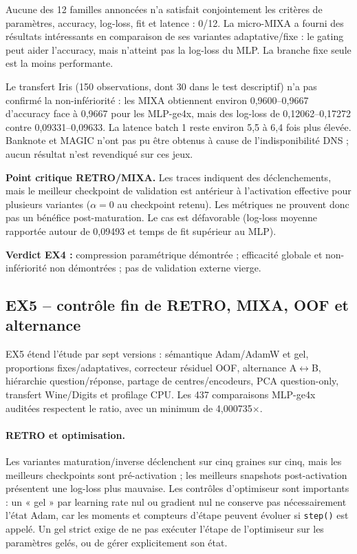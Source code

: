 \documentclass[11pt,a4paper]{article}
\newcommand{\code}[1]{\texttt{\detokenize{#1}}}
\begin{document}
Aucune des 12 familles annoncées n'a satisfait conjointement les critères de paramètres, accuracy, log-loss, fit et latence : 0/12. La micro-MIXA a fourni des résultats intéressants en comparaison de ses variantes adaptative/fixe : le gating peut aider l'accuracy, mais n'atteint pas la log-loss du MLP. La branche fixe seule est la moins performante.

Le transfert Iris (150 observations, dont 30 dans le test descriptif) n'a pas confirmé la non-infériorité : les MIXA obtiennent environ 0,9600--0,9667 d'accuracy face à 0,9667 pour les MLP-ge4x, mais des log-loss de 0,12062--0,17272 contre 0,09331--0,09633. La latence batch 1 reste environ 5,5 à 6,4 fois plus élevée. Banknote et MAGIC n'ont pas pu être obtenus à cause de l'indisponibilité DNS ; aucun résultat n'est revendiqué sur ces jeux.

\textbf{Point critique RETRO/MIXA.} Les traces indiquent des déclenchements, mais le meilleur checkpoint de validation est antérieur à l'activation effective pour plusieurs variantes (\(\alpha=0\) au checkpoint retenu). Les métriques ne prouvent donc pas un bénéfice post-maturation. Le cas \code{retro_linear} est défavorable (log-loss moyenne rapportée autour de 0,09493 et temps de fit supérieur au MLP).

\textbf{Verdict EX4 :} compression paramétrique démontrée ; efficacité globale et non-infériorité non démontrées ; pas de validation externe vierge.

\subsection{EX5 -- contrôle fin de RETRO, MIXA, OOF et alternance}

EX5 étend l'étude par sept versions : sémantique Adam/AdamW et gel, proportions fixes/adaptatives, correcteur résiduel OOF, alternance A\(\leftrightarrow\)B, hiérarchie question/réponse, partage de centres/encodeurs, PCA question-only, transfert Wine/Digits et profilage CPU. Les 437 comparaisons MLP-ge4x auditées respectent le ratio, avec un minimum de 4,000735\(\times\).

\paragraph{RETRO et optimisation.} Les variantes maturation/inverse déclenchent sur cinq graines sur cinq, mais les meilleurs checkpoints sont pré-activation ; les meilleurs snapshots post-activation présentent une log-loss plus mauvaise. Les contrôles d'optimiseur sont importants : un « gel » par learning rate nul ou gradient nul ne conserve pas nécessairement l'état Adam, car les moments et compteurs d'étape peuvent évoluer si \texttt{step()} est appelé. Un gel strict exige de ne pas exécuter l'étape de l'optimiseur sur les paramètres gelés, ou de gérer explicitement son état.
\end{document}
